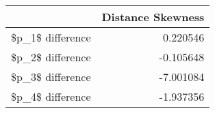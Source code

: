 \begin{tabular}{lr}
\toprule
{} &  Distance Skewness \\
\midrule
\$p\_1\$ difference &           0.220546 \\
\$p\_2\$ difference &          -0.105648 \\
\$p\_3\$ difference &          -7.001084 \\
\$p\_4\$ difference &          -1.937356 \\
\bottomrule
\end{tabular}
